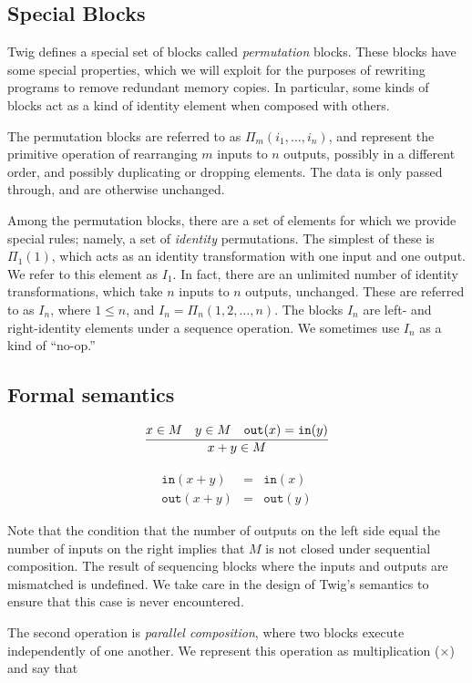 \subsection{Special Blocks}

Twig defines a special set of blocks called \emph{permutation} blocks. These blocks have some special properties, which we will exploit for the purposes of rewriting programs to remove redundant memory copies. In particular, some kinds of blocks act as a kind of identity element when composed with others.

The permutation blocks are referred to as $\Pi_m(i_1,\ldots,i_n)$, and represent the primitive operation of rearranging $m$ inputs to $n$ outputs, possibly in a different order, and possibly duplicating or dropping elements. The data is only passed through, and are otherwise unchanged.

Among the permutation blocks, there are a set of elements for which we provide special rules; namely, a set of \emph{identity} permutations. The simplest of these is $\Pi_1(1)$, which acts as an identity transformation with one input and one output. We refer to this element as $I_1$. In fact, there are an unlimited number of identity transformations, which take $n$ inputs to $n$ outputs, unchanged. These are referred to as $I_n$, where $1 \leq n$, and $I_n = \Pi_n(1,2,\ldots,n)$. The blocks $I_n$ are left- and right-identity elements under a sequence operation. We sometimes use $I_n$ as a kind of ``no-op.''

\subsection{Formal semantics}

\[
\infer
{x+y \in M}
{x \in M \quad y \in M \quad \mathtt{out}(x) = \mathtt{in}(y)}
\]

\begin{eqnarray*}
\mathtt{in} (x+y) &=& \mathtt{in}(x)\\
\mathtt{out}(x+y) &=& \mathtt{out}(y)
\end{eqnarray*}
 
Note that the condition that the number of outputs on the left side equal the number of inputs on the right implies that $M$ is not closed under sequential composition. The result of sequencing blocks where the inputs and outputs are mismatched is undefined. We take care in the design of Twig's semantics to ensure that this case is never encountered.

The second operation is \emph{parallel composition}, where two blocks execute independently of one another. We represent this operation as multiplication ($\times$) and say that

